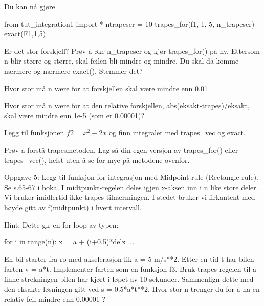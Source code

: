 Du kan nå gjøre
\begin{usncodebox}
from tut_integration1 import *
ntrapeser = 10
trapes_for(f1, 1, 5, n_trapeser)
exact(F1,1,5)
\end{usncodebox}

Er det stor forskjell? Prøv å øke n\_{}trapeser og kjør trapes\_{}for() på ny. Ettersom n blir større og større, skal feilen bli mindre og mindre. Du skal da komme nærmere og nærmere exact(). Stemmer det? 

\begin{exercise}
Hvor stor må n være for at forskjellen skal være mindre enn 0.01
\end{exercise}


\begin{exercise}
Hvor stor må n være for at den relative forskjellen, abs(eksakt-trapes)/eksakt, skal være mindre enn 1e-5 (som er 0.00001)?
\end{exercise} 

\begin{exercise}
Legg til funksjonen $f2 = x^2-2x$ og finn integralet med trapes\_{}vec og exact. 
\end{exercise}

\begin{exercise}
Prøv å forstå trapesmetoden. Lag så din egen versjon av trapes\_{}for() eller trapes\_{}vec(), helst uten å se for mye på metodene ovenfor.
\end{exercise}

\begin{exercise}
Oppgave 5: Legg til funksjon for integrasjon med Midpoint rule (Rectangle rule). 
Se s.65-67 i boka.
I midtpunkt-regelen deles igjen x-aksen inn i n like store deler. 
Vi bruker imidlertid ikke trapes-tilnærmingen.
I stedet bruker vi firkantent med høyde gitt av f(midtpunkt) i hvert intervall.
\end{exercise}

Hint: Dette gir en for-loop av typen:
\begin{usncodebox}
    for i in range(n):
        x = a + (i+0.5)*delx
        ... 
\end{usncodebox}

\begin{exercise}
En bil starter fra ro med akselerasjon lik a = 5 m/s**2. Etter en tid t har bilen farten v = a*t. Implementer farten som en funksjon f3. Bruk trapes-regelen til å finne strekningen bilen har kjørt i løpet av 10 sekunder. Sammenlign dette med den eksakte løsningen gitt ved s = 0.5*a*t**2. Hvor stor n trenger du for å ha en relativ feil mindre enn 0.00001 ?
\end{exercise}


